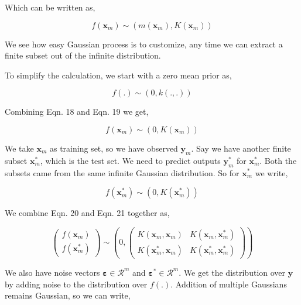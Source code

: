 \documentclass[english]{tktltiki}
\begin{document}
Which can be written as,

\begin{equation}
f(\mathbf{x}_m) \sim (m(\mathbf{x}_m), K(\mathbf{x}_m))
\end{equation}

We see how easy Gaussian process is to customize, any time we can extract a finite subset out of the infinite distribution.

To simplify the calculation, we start with a zero mean prior as,

\begin{equation}
f(.) \sim (0, k(.,.))
\end{equation}

Combining Eqn. 18 and Eqn. 19 we get,

\begin{equation}
f(\mathbf{x}_m) \sim (0, K(\mathbf{x}_m))
\end{equation}

We take $\mathbf{x}_m$ as training set, so we have observed $\mathbf{y}_m$. Say we have another finite subset $\mathbf{x}_m^*$, which is the test set. We need to predict outputs $\mathbf{y}_m^*$ for $\mathbf{x}_m^*$. Both the subsets came from the same infinite Gaussian distribution. So for $\mathbf{x}_m^*$ we write,

\begin{equation}
f(\mathbf{x}_m^*) \sim (0, K(\mathbf{x}_m^*))
\end{equation}

We combine Eqn. 20 and Eqn. 21 together as,

\begin{equation}
\begin{pmatrix}
f(\mathbf{x}_m) \\
f(\mathbf{x}_m^*)
\end{pmatrix}
\sim \left( %
0, %
\begin{pmatrix}
K(\mathbf{x}_m, \mathbf{x}_m) & K(\mathbf{x}_m, \mathbf{x}_m^*) \\
K(\mathbf{x}_m^*, \mathbf{x}_m) & K(\mathbf{x}_m^*, \mathbf{x}_m^*)
\end{pmatrix}\right)
\end{equation}

We also have noise vectors $\mathbf{\varepsilon} \in \mathcal{R}^m$ and $\mathbf{\varepsilon^*} \in \mathcal{R}^m$. We get the distribution over $\mathbf{y}$ by adding noise to the distribution over $f(.)$. Addition of multiple Gaussians remains Gaussian, so we can write,
\end{document}
